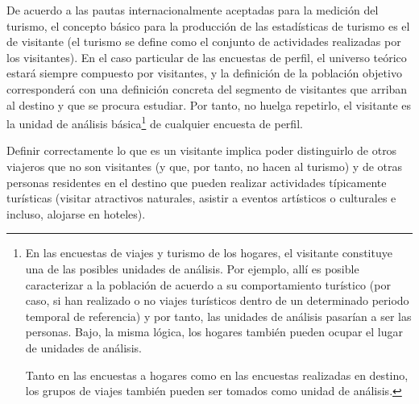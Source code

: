 \documentclass[
]{book}
\begin{document}
De acuerdo a las pautas internacionalmente aceptadas para la medición del turismo, el concepto básico para la producción de las estadísticas de turismo es el de visitante (el turismo se define como el conjunto de actividades realizadas por los visitantes). En el caso particular de las encuestas de perfil, el universo teórico estará siempre compuesto por visitantes, y la definición de la población objetivo corresponderá con una definición concreta del segmento de visitantes que arriban al destino y que se procura estudiar. Por tanto, no huelga repetirlo, el visitante es la unidad de análisis básica\footnote{En las encuestas de viajes y turismo de los hogares, el visitante constituye una de las posibles unidades de análisis. Por ejemplo, allí es posible caracterizar a la población de acuerdo a su comportamiento turístico (por caso, si han realizado o no viajes turísticos dentro de un determinado periodo temporal de referencia) y por tanto, las unidades de análisis pasarían a ser las personas. Bajo, la misma lógica, los hogares también pueden ocupar el lugar de unidades de análisis.

  Tanto en las encuestas a hogares como en las encuestas realizadas en destino, los grupos de viajes también pueden ser tomados como unidad de análisis.} de cualquier encuesta de perfil.

Definir correctamente lo que es un visitante implica poder distinguirlo de otros viajeros que no son visitantes (y que, por tanto, no hacen al turismo) y de otras personas residentes en el destino que pueden realizar actividades típicamente turísticas (visitar atractivos naturales, asistir a eventos artísticos o culturales e incluso, alojarse en hoteles).
\end{document}
